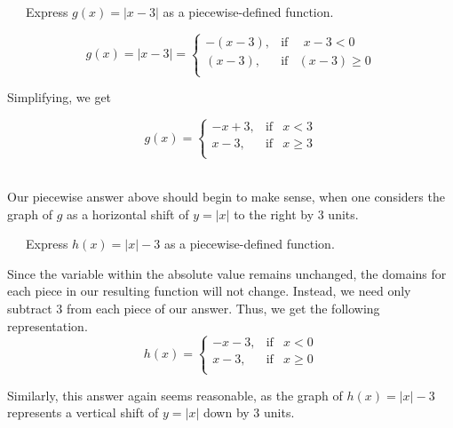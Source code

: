 \begin{example}~~~Express $g(x) = |x-3|$ as a piecewise-defined function.\pp
 
\[ g(x) = |x-3| =  \left\{ \begin{array}{rcl} -(x-3), & \mbox{if} & ~~x-3 < 0  \\ (x-3), & \mbox{if} & (x -3) \geq 0 \\ \end{array} \right.\]

Simplifying, we get

\[ g(x) =\left\{ \begin{array}{rcl} -x+3, & \mbox{if} & x<3  \\ x-3, & \mbox{if} & x \geq 3 \\ \end{array} \right.\]\\
\end{example}
Our piecewise answer above should begin to make sense, when one considers the graph of $g$ as a horizontal shift of $y=|x|$ to the right by 3 units.\pp
\begin{example}~~~Express $h(x) = |x|-3$ as a piecewise-defined function.\pp

Since the variable within the absolute value remains unchanged, the domains for each piece in our resulting function will not change.  Instead, we need only subtract $3$ from each piece of our answer.  Thus, we get the following representation.
\[ h(x) =\left\{ \begin{array}{rcl} -x-3, & \mbox{if} & x<0  \\ x-3, & \mbox{if} & x \geq 0 \\ \end{array} \right.\]
\end{example}
Similarly, this answer again seems reasonable, as the graph of $h(x)=|x|-3$ represents a vertical shift of $y=|x|$ down by 3 units.\pp
